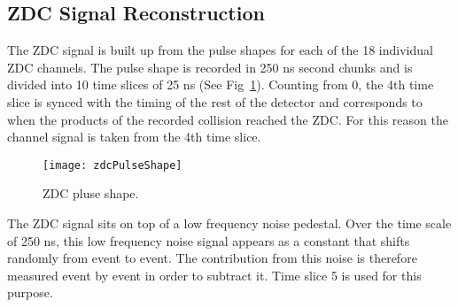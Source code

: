     \subsection{ZDC Signal Reconstruction}
      The ZDC signal is built up from the pulse shapes for each of the 
        18 individual ZDC channels. 
      The pulse shape is recorded in 250 ns second chunks and is divided into
        10 time slices of 25 ns (See Fig~\ref{fig:zdcPulseShape}).
      Counting from 0, the 4th time slice is synced with the timing of the rest
        of the detector and corresponds to when the products of the recorded 
        collision reached the ZDC.
      For this reason the channel signal is taken from the 4th time slice.
      \begin{figure}[h]
        \centering
        \texttt{[image: zdcPulseShape]}
        \caption{ZDC pluse shape.}
        \label{fig:zdcPulseShape}
      \end{figure}

      The ZDC signal sits on top of a low frequency noise pedestal. 
      Over the time scale of 250 ns, this low frequency noise signal appears
        as a constant that shifts randomly from event to event.
      The contribution from this noise is therefore measured event by event
        in order to subtract it.
      Time slice 5 is used for this purpose.

